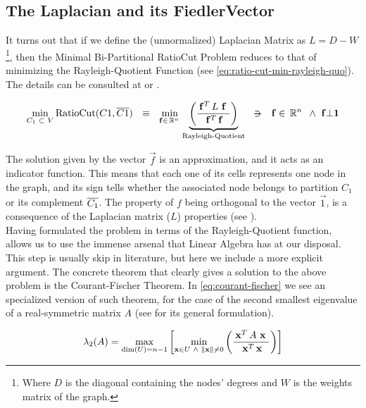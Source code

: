\subsection{The \gls{Laplacian} and its \gls{FiedlerVector}}\label{sub:lap-fvec}
It turns out that if we define the (unnormalized)
\gls{Laplacian} Matrix as $L = D - W$ \footnote{Where $D$ is the diagonal containing
the nodes' degrees and $W$ is the weights matrix of the graph.}, then
the Minimal Bi-Partitional RatioCut Problem reduces to that of minimizing the
Rayleigh-Quotient Function (see
\cref{eq:ratio-cut-min-rayleigh-quo}). The details can be consulted at
\cite{luxburg07} or \cite{gao13}.

\begin{equation}
  \label{eq:ratio-cut-min-rayleigh-quo}
  \min\limits_{C_1 \ds{\subset} V} \func{RatioCut}(C1,\stcomp{C1})
  \ds{\ds{\equiv}}
  \min\limits_{\vec{f} \in \R{n}}
  \underbrace{
    \left(\dfrac{\trans{\vec{f}} L \ds{\vec{f}}}{\trans{\vec{f}} \vec{f}}\right)
  }_{\text{Rayleigh-Quotient}}    
  \ds{\suchthat}
  \vec{f} \in \R{n} \ds{\land} \vec{f} \bot \vec{1}
\end{equation}
\joinbelow{1cm}

The solution given by the vector $\vec{f}$ is an approximation, and it acts
as an indicator function. This means that each one of its cells
represents one node in the graph, and its sign tells whether the
associated node belongs to 
partition $C_1$ or its complement $\overline{C_1}$. The property of $f$
being orthogonal to the vector $\vec{1}$, is a consequence of the
\gls{Laplacian} matrix ($L$) properties (see \cite{luxburg07}). \\

Having formulated the problem in terms of the
Rayleigh-Quotient function, allows us to use the immense arsenal that
Linear Algebra has at our disposal. This step is usually skip in
literature, but here we include a more explicit argument. The concrete
theorem that clearly gives a solution to the above problem is the
Courant-Fischer Theorem. In \cref{eq:courant-fischer} we see an
specialized version of such theorem, for the case of the second 
smallest eigenvalue of a real-symmetric matrix $A$ (see \cite{golub13}
for its general formulation).

\begin{equation}
  \label{eq:courant-fischer}
  \lambda_2(A) =
  \max\limits_{\operatorname{dim}(U) = n-1}
  \left[
    \min\limits_{\mathbf{x} \in U \,\,\land\,\, \left\lVert \mathbf{x} \right\rVert \ne 0}
    \left(  
    \dfrac{\,{\mathbf{x}}^{T}\, A \,\,\mathbf{x}\,\,}{\,{\mathbf{x}}^{T}\, \mathbf{x}}
    \right)
    \right]
\end{equation}
\joinbelow{1cm}


